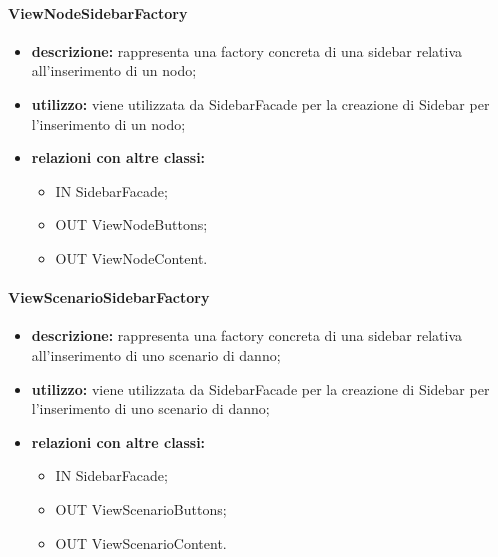 \paragraph{ViewNodeSidebarFactory}
\begin{itemize}
	\item \textbf{descrizione:} rappresenta una factory concreta di una sidebar relativa all'inserimento di un nodo;
	\item \textbf{utilizzo:} viene utilizzata da SidebarFacade per la creazione di Sidebar per l'inserimento di un nodo;
	\item \textbf{relazioni con altre classi:} 
	\begin{itemize}
		\item IN SidebarFacade;
		\item OUT ViewNodeButtons;
		\item OUT ViewNodeContent.
	\end{itemize}
\end{itemize}
\paragraph{ViewScenarioSidebarFactory}
\begin{itemize}
	\item \textbf{descrizione:} rappresenta una factory concreta di una sidebar relativa all'inserimento di uno scenario di danno;
	\item \textbf{utilizzo:} viene utilizzata da SidebarFacade per la creazione di Sidebar per l'inserimento di uno scenario di danno;
	\item \textbf{relazioni con altre classi:} 
	\begin{itemize}
		\item IN SidebarFacade;
		\item OUT ViewScenarioButtons;
		\item OUT ViewScenarioContent.
	\end{itemize}
\end{itemize}
\newpage
